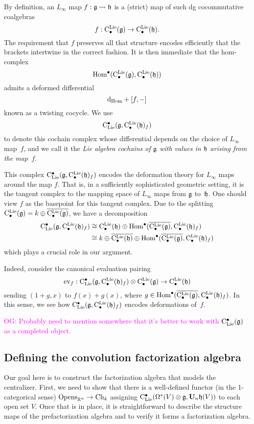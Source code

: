 \documentclass[11pt]{amsart}
\numberwithin{equation}{section}
\def\owen{\textcolor{magenta}{OG: }\textcolor{magenta}}
\begin{document}
By definition, an $L_\infty$ map $f: \mathfrak g \rightsquigarrow \mathfrak h$ is a (strict) map of such dg cocommutative coalgebras
\[
f: {\rm C}^{\rm Lie}_\bullet(\mathfrak g) \to {\rm C}^{\rm Lie}_\bullet(\mathfrak h).
\]
The requirement that $f$ preserves all that structure encodes efficiently that the brackets intertwine in the correct fashion.
It is then immediate that the hom-complex
\[
{\rm Hom}^\bullet ({\rm C}^{\rm Lie}_\bullet(\mathfrak g), {\rm C}^{\rm Lie}_\bullet(\mathfrak h))
\]
admits a deformed differential
\[
{\rm d}_{\rm Hom} + [f,-]
\]
known as a twisting cocycle.
We use 
\[
{\rm C}_{\rm Lie}^\bullet(\mathfrak g,{\rm C}^{\rm Lie}_\bullet(\mathfrak h)_f)
\]
to denote this cochain complex whose differential depends on the choice of $L_\infty$ map~$f$,
and we call it the {\em Lie algebra cochains of $\mathfrak g$ with values in $\mathfrak h$ arising from the map~$f$}.

This complex ${\rm C}_{\rm Lie}^\bullet(\mathfrak g,{\rm C}^{\rm Lie}_\bullet(\mathfrak h)_f)$ encodes the deformation theory for $L_\infty$ maps around the map $f$.
That is, in a sufficiently sophisticated geometric setting, it is the tangent complex to the mapping space of $L_\infty$ maps from $\mathfrak g$ to~$\mathfrak h$.
One should view $f$ as the basepoint for this tangent complex.
Due to the splitting ${\rm C}^{\rm Lie}_\bullet(\mathfrak g) = k \oplus \overline{{\rm C}^{\rm Lie}_\bullet(\mathfrak g)}$,
we have a decomposition
\begin{align*}
{\rm C}_{\rm Lie}^\bullet(\mathfrak g,{\rm C}^{\rm Lie}_\bullet(\mathfrak h)_f) 
&\cong {\rm C}^{\rm Lie}_\bullet(\mathfrak h) \oplus {\rm Hom}^\bullet(\overline{{\rm C}^{\rm Lie}_\bullet(\mathfrak g)}, {\rm C}^{\rm Lie}_\bullet(\mathfrak h)_f)\\
&\cong k \oplus \overline{{\rm C}^{\rm Lie}_\bullet(\mathfrak h)} \oplus {\rm Hom}^\bullet(\overline{{\rm C}^{\rm Lie}_\bullet(\mathfrak g)}, {\rm C}^{\rm Lie}_\bullet(\mathfrak h)_f)
\end{align*}
which plays a crucial role in our argument.

Indeed, consider the canonical evaluation pairing
\[
{\rm ev}_{f}: {\rm C}_{\rm Lie}^\bullet(\mathfrak g,{\rm C}^{\rm Lie}_\bullet(\mathfrak h)_f) \otimes {\rm C}^{\rm Lie}_\bullet(\mathfrak g) \to {\rm C}^{\rm Lie}_\bullet(\mathfrak h)
\]
sending $(1 + g, x)$ to $f(x) + g(x)$, where $g \in {\rm Hom}^\bullet(\overline{{\rm C}^{\rm Lie}_\bullet(\mathfrak g)}, {\rm C}^{\rm Lie}_\bullet(\mathfrak h)_f)$.
In this sense, we see how ${\rm C}_{\rm Lie}^\bullet(\mathfrak g,{\rm C}^{\rm Lie}_\bullet(\mathfrak h)_f)$ encodes deformations of~$f$.

\owen{Probably need to mention somewhere that it's better to work with ${\rm C}_{\rm Lie}^\bullet(\mathfrak g)$ as a completed object.}

\subsection{Defining the convolution factorization algebra}
\label{sec: dfn of centralizer fact alg}

Our goal here is to construct the factorization algebra that models the centralizer.
First, we need to show that there is a well-defined functor (in the 1-categorical sense) ${\rm Opens}_{\mathbb R^n} \to {\rm Ch}_k$ assigning ${\rm C}_{\rm Lie}^\bullet(\Omega^*(V) \otimes \mathfrak g, \mathbf U_n \mathfrak h(V))$ to each open set $V$.
Once that is in place, it is straightforward to describe the structure maps of the prefactorization algebra and to verify it forms a factorization algebra.
\end{document}
